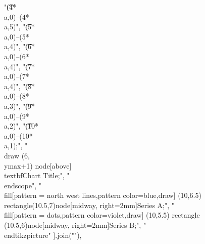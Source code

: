 "\t\t(4*\\a,0)--(4*\\a,5)",
"\t\t(5*\\a,0)--(5*\\a,4)",
"\t\t(6*\\a,0)--(6*\\a,4)",
"\t\t(7*\\a,0)--(7*\\a,4)",
"\t\t(8*\\a,0)--(8*\\a,3)",
"\t\t(9*\\a,0)--(9*\\a,2)",
"\t\t(10*\\a,0)--(10*\\a,1);",
"\t\t\\draw (6,\\ymax+1) node[above]{\\textbf{Chart Title}};",
"\t\\end{scope}",
"\t\\fill[pattern = north west lines,pattern color=blue,draw] (10,6.5) rectangle(10.5,7)node[midway, right=2mm]{Series A};",
"\t\\fill[pattern = dots,pattern color=violet,draw] (10,5.5) rectangle (10.5,6)node[midway, right=2mm]{Series B};",
"\\end{tikzpicture}"
].join("\n"),

